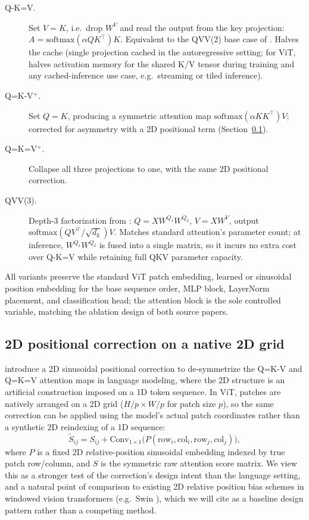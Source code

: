 \documentclass[11pt]{article}
\newcommand{\wv}{W^{V}}
\begin{document}
\begin{description}
    \item[Q-K=V.] Set \(V=K\), i.e.\ drop \(\wv\) and read the output from
    the key projection: \(A=\mathrm{softmax}(\alpha QK^\top)K\). Equivalent
    to the QVV(2) base case of \citet{gao2026keyless}. Halves the
    cache (single projection cached in the autoregressive setting; for
    ViT, halves activation memory for the shared K/V tensor during
    training and any cached-inference use case, e.g.\ streaming or
    tiled inference).
    \item[Q=K-V\(^+\).] Set \(Q=K\), producing a symmetric attention map
    \(\mathrm{softmax}(\alpha KK^\top)V\); corrected for asymmetry with a
    2D positional term (Section~\ref{sec:posenc}).
    \item[Q=K=V\(^+\).] Collapse all three projections to one, with the
    same 2D positional correction.
    \item[QVV(3).] Depth-3 factorization from \citet{gao2026keyless}:
    \(Q = X W^{Q_1}W^{Q_2}\), \(V=X\wv\), output
    \(\mathrm{softmax}(QV^\top/\sqrt{d_k})V\). Matches standard attention's
    parameter count; at inference, \(W^{Q_1}W^{Q_2}\) is fused into a single
    matrix, so it incurs no extra cost over Q-K=V while retaining full
    QKV parameter capacity.
\end{description}

All variants preserve the standard ViT patch embedding, learned or
sinusoidal position embedding for the base sequence order, MLP block,
LayerNorm placement, and classification head; the attention block is the
sole controlled variable, matching the ablation design of both source
papers.

\subsection{2D positional correction on a native 2D grid}
\label{sec:posenc}
\citet{kayyam2026three} introduce a 2D sinusoidal positional correction to
de-symmetrize the Q=K-V and Q=K=V attention maps in language modeling, where
the 2D structure is an artificial construction imposed on a 1D token
sequence. In ViT, patches are natively arranged on a 2D grid
(\(H/p \times W/p\) for patch size \(p\)), so the same correction can be
applied using the model's actual patch coordinates rather than a synthetic
2D reindexing of a 1D sequence:
\begin{equation}
    \tilde{S}_{ij} = S_{ij} + \mathrm{Conv}_{1\times1}\big(P(\mathrm{row}_i,\mathrm{col}_i,\mathrm{row}_j,\mathrm{col}_j)\big),
\end{equation}
where \(P\) is a fixed 2D relative-position sinusoidal embedding indexed by
true patch row/column, and \(S\) is the symmetric raw attention score matrix.
We view this as a stronger test of the correction's design intent than the
language setting, and a natural point of comparison to existing 2D relative
position bias schemes in windowed vision transformers (e.g.\ Swin
\citep{liu2021swin}), which we will cite as a baseline design pattern rather
than a competing method.
\end{document}
